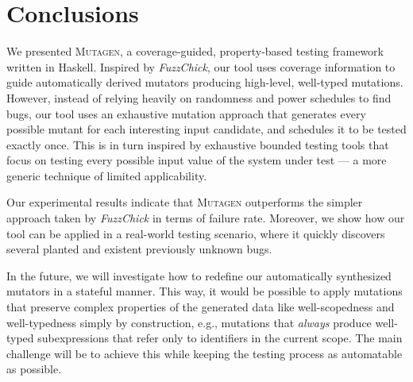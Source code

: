 \documentclass[acmsmall, anonymous]{acmart}
\newcommand{\fuzzchick}{\textit{FuzzChick}\xspace}
\newcommand{\mutagen}{\textsc{Mutagen}\xspace}
\begin{document}

\section{Conclusions}
\label{sec:conclusions}

We presented \mutagen, a coverage-guided, property-based testing framework
written in Haskell.
%
Inspired by \fuzzchick, our tool uses coverage information to guide
automatically derived mutators producing high-level, well-typed mutations.
%
However, instead of relying heavily on randomness and power schedules to find
bugs, our tool uses an exhaustive mutation approach that generates every
possible mutant for each interesting input candidate, and schedules it to be
tested exactly once.
%
This is in turn inspired by exhaustive bounded testing tools that focus on
testing every possible input value of the system under test --- a more generic
technique of limited applicability.


Our experimental results indicate that \mutagen outperforms the simpler approach
taken by \fuzzchick in terms of failure rate.
%
Moreover, we show how our tool can be applied in a real-world testing scenario,
where it quickly discovers several planted and existent previously unknown bugs.


In the future, we will investigate how to redefine our automatically synthesized
mutators in a stateful manner.
%
This way, it would be possible to apply mutations that preserve complex
properties of the generated data like well-scopedness and well-typedness simply
by construction, e.g., mutations that \emph{always} produce well-typed
subexpressions that refer only to identifiers in the current scope.
%
The main challenge will be to achieve this while keeping the testing process as
automatable as possible.










\end{document}
